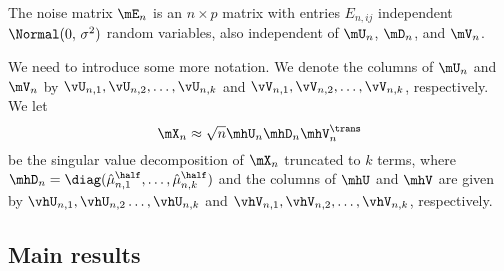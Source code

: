 \begin{assumption}\label{A:noise}
    The noise matrix $\mE_n$ is an $n\times p$ matrix with entries 
    $E_{n,ij}$ independent $\Normal(0,\, \sigma^2)$ random variables, also
    independent of $\mU_n$, $\mD_n$, and $\mV_n$.
\end{assumption}
\noindent

We need to introduce some more notation. We denote the columns of $\mU_n$ and
$\mV_n$ by $\vU_{n,1}, \vU_{n,2}, \ldots, \vU_{n,k}$ and $\vV_{n,1},
\vV_{n,2}, \ldots, \vV_{n,k}$, respectively. We let 
\[
    \mX_n \approx \sqrt{n} \mhU_n \mhD_n \mhV_n^\trans
\]
be the singular value decomposition of
$\mX_n$ truncated to $k$ terms, where $\mhD_n = \diag( \hat \mu_{n,1}^\half,
\ldots, \hat \mu_{n,k}^\half)$ and the columns of $\mhU$ and $\mhV$ are given
by $\vhU_{n,1}, \vhU_{n,2} \ldots, \vhU_{n,k}$ and $\vhV_{n,1}, \vhV_{n,2},
\ldots, \vhV_{n,k}$, respectively.


\subsection{Main results}

